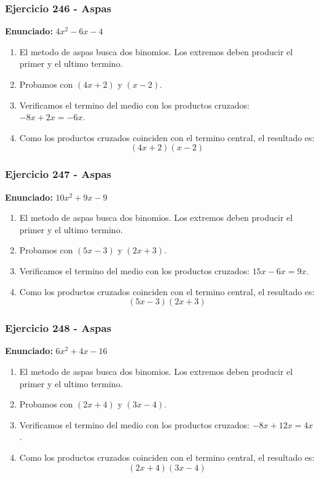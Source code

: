 \documentclass[11pt,a4paper]{article}
\begin{document}
\vspace{0.2cm}
\subsubsection*{Ejercicio 246 - Aspas}
\textbf{Enunciado:} $ 4 x^{2} - 6 x - 4 $\par
\begin{enumerate}[leftmargin=2em]
\item El metodo de aspas busca dos binomios. Los extremos deben producir el primer y el ultimo termino.
\item Probamos con \((4 x + 2)\) y \((x - 2)\).
\item Verificamos el termino del medio con los productos cruzados: \(- 8 x+2 x=- 6 x\).
\item Como los productos cruzados coinciden con el termino central, el resultado es: \[\boxed{\left(4 x + 2\right)\left(x - 2\right)}\]
\end{enumerate}

\vspace{0.2cm}
\subsubsection*{Ejercicio 247 - Aspas}
\textbf{Enunciado:} $ 10 x^{2} + 9 x - 9 $\par
\begin{enumerate}[leftmargin=2em]
\item El metodo de aspas busca dos binomios. Los extremos deben producir el primer y el ultimo termino.
\item Probamos con \((5 x - 3)\) y \((2 x + 3)\).
\item Verificamos el termino del medio con los productos cruzados: \(15 x- 6 x=9 x\).
\item Como los productos cruzados coinciden con el termino central, el resultado es: \[\boxed{\left(5 x - 3\right)\left(2 x + 3\right)}\]
\end{enumerate}

\vspace{0.2cm}
\subsubsection*{Ejercicio 248 - Aspas}
\textbf{Enunciado:} $ 6 x^{2} + 4 x - 16 $\par
\begin{enumerate}[leftmargin=2em]
\item El metodo de aspas busca dos binomios. Los extremos deben producir el primer y el ultimo termino.
\item Probamos con \((2 x + 4)\) y \((3 x - 4)\).
\item Verificamos el termino del medio con los productos cruzados: \(- 8 x+12 x=4 x\).
\item Como los productos cruzados coinciden con el termino central, el resultado es: \[\boxed{\left(2 x + 4\right)\left(3 x - 4\right)}\]
\end{enumerate}
\end{document}
